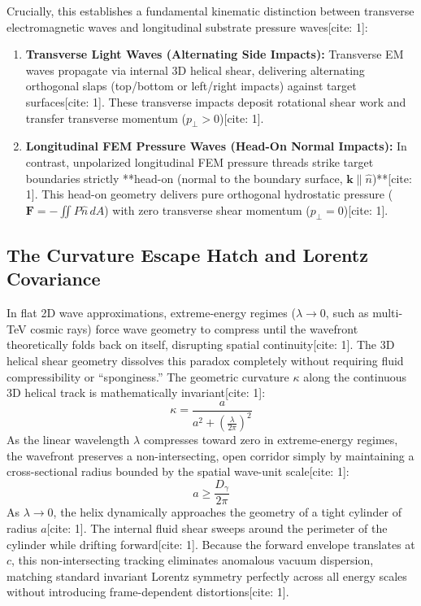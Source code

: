 \documentclass[11pt,a4paper]{article}
\begin{document}
	Crucially, this establishes a fundamental kinematic distinction between transverse electromagnetic waves and longitudinal substrate pressure waves[cite: 1]:
	\begin{enumerate}
		\item \textbf{Transverse Light Waves (Alternating Side Impacts):} Transverse EM waves propagate via internal 3D helical shear, delivering alternating orthogonal slaps (top/bottom or left/right impacts) against target surfaces[cite: 1]. These transverse impacts deposit rotational shear work and transfer transverse momentum ($p_\perp > 0$)[cite: 1].
		\item \textbf{Longitudinal FEM Pressure Waves (Head-On Normal Impacts):} In contrast, unpolarized longitudinal FEM pressure threads strike target boundaries strictly **head-on (normal to the boundary surface, $\mathbf{k} \parallel \hat{n}$)**[cite: 1]. This head-on geometry delivers pure orthogonal hydrostatic pressure ($\mathbf{F} = -\iint P \hat{n} \, dA$) with zero transverse shear momentum ($p_\perp = 0$)[cite: 1].
	\end{enumerate}
	
	\subsection{The Curvature Escape Hatch and Lorentz Covariance}
	In flat 2D wave approximations, extreme-energy regimes ($\lambda \to 0$, such as multi-TeV cosmic rays) force wave geometry to compress until the wavefront theoretically folds back on itself, disrupting spatial continuity[cite: 1]. The 3D helical shear geometry dissolves this paradox completely without requiring fluid compressibility or ``sponginess.'' The geometric curvature $\kappa$ along the continuous 3D helical track is mathematically invariant[cite: 1]:
	\begin{equation}
		\kappa = \frac{a}{a^2 + \left(\frac{\lambda}{2\pi}\right)^2}
	\end{equation}
	As the linear wavelength $\lambda$ compresses toward zero in extreme-energy regimes, the wavefront preserves a non-intersecting, open corridor simply by maintaining a cross-sectional radius bounded by the spatial wave-unit scale[cite: 1]:
	\begin{equation}
		a \ge \frac{D_\gamma}{2\pi}
	\end{equation}
	As $\lambda \to 0$, the helix dynamically approaches the geometry of a tight cylinder of radius $a$[cite: 1]. The internal fluid shear sweeps around the perimeter of the cylinder while drifting forward[cite: 1]. Because the forward envelope translates at $c$, this non-intersecting tracking eliminates anomalous vacuum dispersion, matching standard invariant Lorentz symmetry perfectly across all energy scales without introducing frame-dependent distortions[cite: 1].
	
\end{document}
